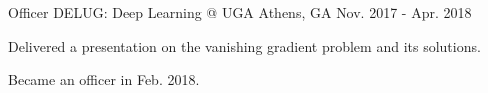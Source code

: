 \begin{cventries}

\cventry
{Officer}
{DELUG: Deep Learning @ UGA}
{Athens, GA}
{Nov. 2017 - Apr. 2018}
{\begin{cvitems}
    \item {Delivered a presentation on the vanishing gradient problem and its solutions.}
    \item {Became an officer in Feb. 2018.}
\end{cvitems}}

\end{cventries}
